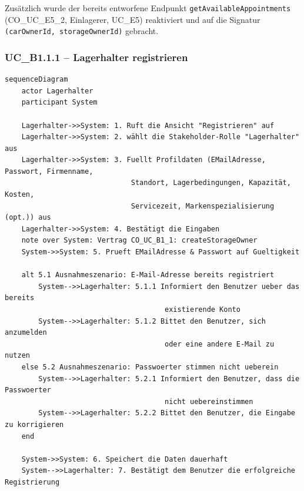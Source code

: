 Zus\"{a}tzlich wurde der bereits entworfene Endpunkt \texttt{getAvailableAppointments}
(CO\_UC\_E5\_2, Einlagerer, UC\_E5) reaktiviert und auf die Signatur
\texttt{(carOwnerId, storageOwnerId)} gebracht.
\newpage


{}
\subsubsection*{UC\_B1.1.1 – Lagerhalter registrieren}

\begin{lstlisting}[basicstyle=\ttfamily\small, breaklines=true]
sequenceDiagram
    actor Lagerhalter
    participant System

    Lagerhalter->>System: 1. Ruft die Ansicht "Registrieren" auf
    Lagerhalter->>System: 2. wählt die Stakeholder-Rolle "Lagerhalter" aus
    Lagerhalter->>System: 3. Fuellt Profildaten (EMailAdresse, Passwort, Firmenname,
                              Standort, Lagerbedingungen, Kapazität, Kosten,
                              Servicezeit, Markenspezialisierung (opt.)) aus
    Lagerhalter->>System: 4. Bestätigt die Eingaben
    note over System: Vertrag CO_UC_B1_1: createStorageOwner
    System->>System: 5. Prueft EMailAdresse & Passwort auf Gueltigkeit

    alt 5.1 Ausnahmeszenario: E-Mail-Adresse bereits registriert
        System-->>Lagerhalter: 5.1.1 Informiert den Benutzer ueber das bereits
                                      existierende Konto
        System-->>Lagerhalter: 5.1.2 Bittet den Benutzer, sich anzumelden
                                      oder eine andere E-Mail zu nutzen
    else 5.2 Ausnahmeszenario: Passwoerter stimmen nicht ueberein
        System-->>Lagerhalter: 5.2.1 Informiert den Benutzer, dass die Passwoerter
                                      nicht uebereinstimmen
        System-->>Lagerhalter: 5.2.2 Bittet den Benutzer, die Eingabe zu korrigieren
    end

    System->>System: 6. Speichert die Daten dauerhaft
    System-->>Lagerhalter: 7. Bestätigt dem Benutzer die erfolgreiche Registrierung
\end{lstlisting}

